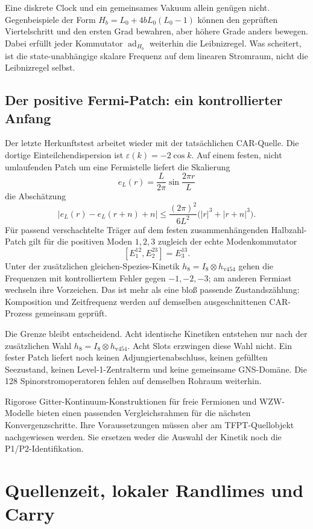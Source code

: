 Eine diskrete Clock und ein gemeinsames Vakuum allein genügen nicht. Gegenbeispiele der Form $H_b=L_0+4bL_0(L_0-1)$ können den geprüften Viertelschritt und den ersten Grad bewahren, aber höhere Grade anders bewegen. Dabei erfüllt jeder Kommutator $\operatorname{ad}_{H_b}$ weiterhin die Leibnizregel. Was scheitert, ist die state-unabhängige skalare Frequenz auf dem linearen Stromraum, nicht die Leibnizregel selbst. 

\section{Der positive Fermi-Patch: ein kontrollierter Anfang}
Der letzte Herkunftstest arbeitet wieder mit der tatsächlichen CAR-Quelle. Die dortige Einteilchendispersion ist $\varepsilon(k)=-2\cos k$. Auf einem festen, nicht umlaufenden Patch um eine Fermistelle liefert die Skalierung
\[
 e_L(r)=\frac L{2\pi}\sin\frac{2\pi r}L
\]
die Abschätzung
\[
 \bigl|e_L(r)-e_L(r+n)+n\bigr|
 \le\frac{(2\pi)^2}{6L^2}\bigl(|r|^3+|r+n|^3\bigr).
\]
Für passend verschachtelte Träger auf dem festen zusammenhängenden Halbzahl-Patch gilt für die positiven Moden $1,2,3$ zugleich der echte Modenkommutator
\[
 [E^{12}_1,E^{23}_2]=E^{13}_3.
\]
Unter der zusätzlichen gleichen-Spezies-Kinetik $h_8=I_8\otimes h_{\mathrm{v454}}$ gehen die Frequenzen mit kontrolliertem Fehler gegen $-1,-2,-3$; am anderen Fermiast wechseln ihre Vorzeichen. Das ist mehr als eine bloß passende Zustandszählung: Komposition und Zeitfrequenz werden auf demselben ausgeschnittenen CAR-Prozess gemeinsam geprüft. 

Die Grenze bleibt entscheidend. Acht identische Kinetiken entstehen nur nach der zusätzlichen Wahl $h_8=I_8\otimes h_{\mathrm{v454}}$. Acht Slots erzwingen diese Wahl nicht. Ein fester Patch liefert noch keinen Adjungiertenabschluss, keinen gefüllten Seezustand, keinen Level-1-Zentralterm und keine gemeinsame GNS-Domäne. Die 128 Spinorstromoperatoren fehlen auf demselben Rohraum weiterhin.

Rigorose Gitter-Kontinuum-Konstruktionen für freie Fermionen und WZW-Modelle bieten einen passenden Vergleichsrahmen für die nächsten Konvergenzschritte. Ihre Voraussetzungen müssen aber am TFPT-Quellobjekt nachgewiesen werden. Sie ersetzen weder die Auswahl der Kinetik noch die P1/P2-Identifikation. \cite{osborne}



\chapter{Quellenzeit, lokaler Randlimes und Carry}
